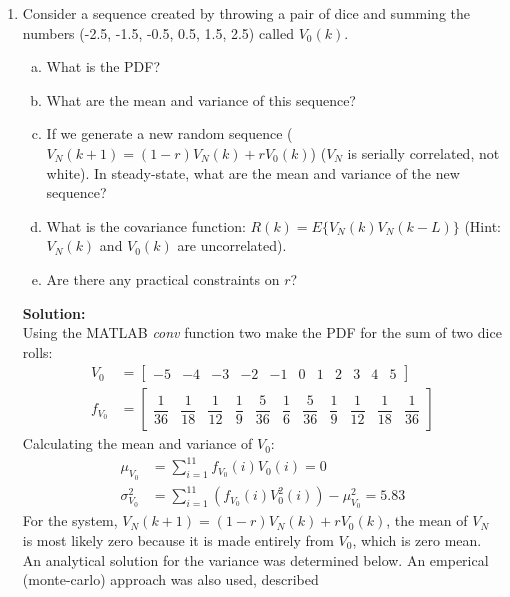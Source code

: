 \documentclass[11pt]{article}
\newcommand{\solution}{\textbf{Solution: \\}}
\begin{document}
\begin{enumerate}[label=\textbf{\arabic*.}]
  \item Consider a sequence created by throwing a pair of dice and summing the 
  numbers (-2.5, -1.5, -0.5, 0.5, 1.5, 2.5) called $V_0(k)$.
  \begin{enumerate}[(a)]
    \itemsep -2pt
    \item What is the PDF?
    \item What are the mean and variance of this sequence?
    \item If we generate a new random sequence ($V_N(k+1)=(1-r)V_N(k)+rV_0(k)$) 
    ($V_N$ is serially correlated, not white). In steady-state, what are the 
    mean and variance of the new sequence?
    \item What is the covariance function: $R(k)=E\{V_N(k)V_N(k-L)\}$ (Hint: 
    $V_N(k)$ and $V_0(k)$ are uncorrelated).
    \item Are there any practical constraints on $r$?
  \end{enumerate}
  \solution
  Using the MATLAB \emph{conv} function two make the PDF for the sum 
  of two dice rolls:
  \begin{equation*}
    \begin{split}
      V_0 &=
      \begin{bmatrix}
        -5 & -4 & -3 & -2 & -1 & 0 & 1 & 2 & 3 & 4 & 5
      \end{bmatrix}
      \\ f_{V_0} &= 
      \begin{bmatrix} 
        \dfrac{1}{36} & \dfrac{1}{18} & \dfrac{1}{12} & \dfrac{1}{9} & \dfrac{5}{36} & \dfrac{1}{6} & \dfrac{5}{36} & \dfrac{1}{9} & \dfrac{1}{12} & \dfrac{1}{18} & \dfrac{1}{36}
      \end{bmatrix}
    \end{split}
  \end{equation*}
  Calculating the mean and variance of $V_0$:
  \begin{equation*}
    \begin{split}
      \mu_{V_0} &= \sum_{i=1}^{11} f_{V_0}(i)V_0(i) = 0\\
      \sigma_{V_0}^2 &= \sum_{i=1}^{11} \left(f_{V_0}(i)V_0^2(i)\right) - \mu_{V_0}^2 = 5.83
    \end{split}
  \end{equation*}
  For the system, $V_N(k+1)=(1-r)V_N(k)+rV_0(k)$, the mean of $V_N$ is 
  most likely zero because it is made entirely from $V_0$, which 
  is zero mean. An analytical solution for the variance was determined 
  below. An emperical (monte-carlo) approach was also used, described 

\end{enumerate}
\end{document}
